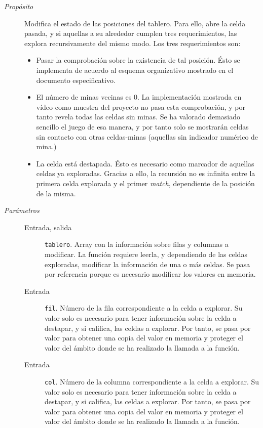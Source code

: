 \documentclass[12pt]{article}
\begin{document}
\begin{description}

\item[\emph{Propósito}]

Modifica el estado de las posiciones del tablero. Para ello, abre la celda
pasada, y si aquellas a su alrededor cumplen tres requerimientos, las explora
recursivamente del mismo modo. Los tres requerimientos son:

\begin{itemize}

\item Pasar la comprobación sobre la existencia de tal posición. Ésto se
implementa de acuerdo al esquema organizativo mostrado en el documento
especificativo.
\item El número de minas vecinas es 0. La implementación mostrada en vídeo como
muestra del proyecto no pasa esta comprobación, y por tanto revela todas las
celdas sin minas. Se ha valorado demasiado sencillo el juego de esa manera, y
por tanto solo se mostrarán celdas sin contacto con otras celdas-minas (aquellas
sin indicador numérico de mina.)
\item La celda está destapada. Ésto es necesario como marcador de aquellas
celdas ya exploradas. Gracias a ello, la recursión no es infinita entre la
primera celda explorada y el primer \emph{match}, dependiente de la posición de
la misma.

\end{itemize}

\item[\emph{Parámetros}] \leavevmode

\begin{description}

\item[Entrada, salida] \texttt{tablero}. Array con la información sobre
filas y columnas a modificar. La función requiere leerla, y dependiendo de las
celdas exploradas, modificar la información de una o más celdas. Se pasa por
referencia porque es necesario modificar los valores en memoria.

\item[Entrada] \texttt{fil}. Número de la fila correspondiente a la
celda a explorar. Su valor solo es necesario para tener información sobre la
celda a destapar, y si califica, las celdas a explorar. Por tanto, se pasa por
valor para obtener una copia del valor en memoria y proteger el valor del ámbito
donde se ha realizado la llamada a la función.

\item[Entrada] \texttt{col}. Número de la columna correspondiente a la
celda a explorar. Su valor solo es necesario para tener información sobre la
celda a destapar, y si califica, las celdas a explorar. Por tanto, se pasa por
valor para obtener una copia del valor en memoria y proteger el valor del ámbito
donde se ha realizado la llamada a la función.

\end{description}

\end{description}
\end{document}
